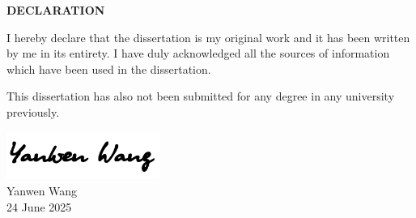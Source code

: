 \begin{center}
    {\large \textbf{DECLARATION}}
\end{center}

\vspace{3cm}

\begin{center}
    I hereby declare that the dissertation is my original work and it has
    been written by me in its entirety. I have duly
    acknowledged all the sources of information which have
    been used in the dissertation.

    \vspace{1cm}

    This dissertation has also not been submitted for any degree in any
    university previously.

    \vspace{4cm}

    \includegraphics[width=5cm]{misc./signature.png}\\[0.5cm]
    Yanwen Wang\\
    24 June 2025
\end{center}

\thispagestyle{plain}
\clearpage